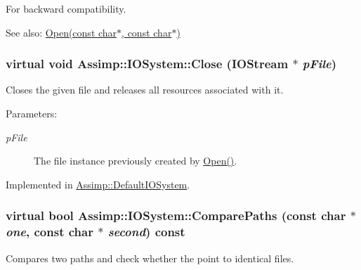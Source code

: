 For backward compatibility. 

\begin{Desc}
\item[See also:]\hyperlink{class_assimp_1_1_i_o_system_c512ece3b0701de5682553007a4c0816}{Open(const char$\ast$, const char$\ast$)} \end{Desc}
\hypertarget{class_assimp_1_1_i_o_system_8c334d60f04bceeb6bd0157d21723f3e}{
\subsubsection[Close]{\setlength{\rightskip}{0pt plus 5cm}virtual void Assimp::IOSystem::Close ({\bf IOStream} $\ast$ {\em pFile})}}
\label{class_assimp_1_1_i_o_system_8c334d60f04bceeb6bd0157d21723f3e}


Closes the given file and releases all resources associated with it. 

\begin{Desc}
\item[Parameters:]
\begin{description}
\item[{\em pFile}]The file instance previously created by \hyperlink{class_assimp_1_1_i_o_system_c512ece3b0701de5682553007a4c0816}{Open()}. \end{description}
\end{Desc}


Implemented in \hyperlink{class_assimp_1_1_default_i_o_system_a164cf18562082effde576752377bea3}{Assimp::DefaultIOSystem}.\hypertarget{class_assimp_1_1_i_o_system_11349a65b353ed62f655c3dd802b9062}{
\subsubsection[ComparePaths]{\setlength{\rightskip}{0pt plus 5cm}virtual bool Assimp::IOSystem::ComparePaths (const char $\ast$ {\em one}, \/  const char $\ast$ {\em second}) const}}
\label{class_assimp_1_1_i_o_system_11349a65b353ed62f655c3dd802b9062}


Compares two paths and check whether the point to identical files. 

